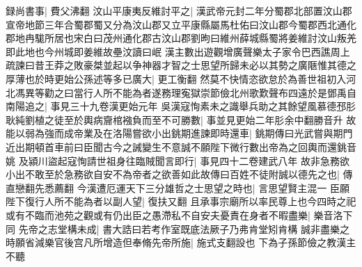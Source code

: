 録尚書事|{
	費父沸翻}
汶山平康夷反維討平之|{
	漢武帝元封二年分蜀郡北部置汶山郡宣帝地節三年合蜀郡蜀又分為汶山郡又立平康縣屬馬杜佑曰汶山郡今蜀郡西北通化郡地冉駹所居也宋白曰茂州通化郡古汶山郡劉昫曰維州薛城縣蜀將姜維討汶山叛羌即此地也今州城即姜維故壘汶讀曰岷}
漢主數出遊觀增廣聲樂太子家令巴西譙周上疏諫曰昔王莽之敗豪桀並起以争神器才智之士思望所歸未必以其勢之廣陿惟其德之厚薄也於時更始公孫述等多已廣大|{
	更工衡翻}
然莫不快情恣欲怠於為善世祖初入河北馮異等勸之曰當行人所不能為者遂務理寃獄崇節儉北州歌歎聲布四遠於是鄧禹自南陽追之|{
	事見三十九卷漢更始元年}
吳漢寇恂素未之識舉兵助之其餘望風慕德邳肜耿純劉植之徒至於輿病齎棺襁負而至不可勝數|{
	事並見更始二年肜余中翻勝音升}
故能以弱為強而成帝業及在洛陽嘗欲小出銚期進諫即時還車|{
	銚期傳曰光武嘗與期門近出期頓首車前曰臣聞古今之誡變生不意誠不願陛下微行數出帝為之回輿而還銚音姚}
及潁川盜起寇恂請世祖身往臨賊聞言即行|{
	事見四十二卷建武八年}
故非急務欲小出不敢至於急務欲自安不為帝者之欲善如此故傳曰百姓不徒附誠以德先之也|{
	傳直戀翻先悉薦翻}
今漢遭厄運天下三分雄哲之士思望之時也|{
	言思望賢主混一}
臣願陛下復行人所不能為者以副人望|{
	復扶又翻}
且承事宗廟所以率民尊上也今四時之祀或有不臨而池苑之觀或有仍出臣之愚滯私不自安夫憂責在身者不暇盡樂|{
	樂音洛下同}
先帝之志堂構未成|{
	書大誥曰若考作室既底法厥子乃弗肯堂矧肯構}
誠非盡樂之時願省減樂官後宫凡所增造但奉脩先帝所施|{
	施式支翻設也}
下為子孫節儉之教漢主不聽


